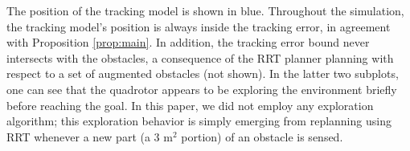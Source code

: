 The position of the tracking model is shown in blue. Throughout the simulation, the tracking model's position is always inside the tracking error, in agreement with Proposition \ref{prop:main}. In addition, the tracking error bound never intersects with the obstacles, a consequence of the RRT planner planning with respect to a set of augmented obstacles (not shown). In the latter two subplots, one can see that the quadrotor appears to be exploring the environment briefly before reaching the goal. In this paper, we did not employ any exploration algorithm; this exploration behavior is simply emerging from replanning using RRT whenever a new part (a $3$ m$^2$ portion) of an obstacle is sensed.